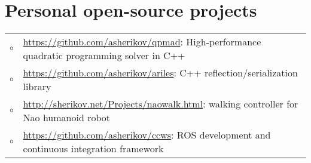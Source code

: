 \documentclass[a4paper,10pt]{report}
\begin{document}
\vspace{0.15cm}
\section{Personal open-source projects}
\begin{adjustwidth}{0.5cm}{0pt}
    \begin{tabularx}{\linewidth}{l X}
        \hfill $\circ$  & \url{https://github.com/asherikov/qpmad}:
                            High-performance quadratic programming solver in C++ \\

        \hfill $\circ$  & \url{https://github.com/asherikov/ariles}:
                            C++ reflection/serialization library \\

        \hfill $\circ$  & \url{http://sherikov.net/Projects/naowalk.html}:
                            walking controller for Nao humanoid robot \\

        \hfill $\circ$  & \url{https://github.com/asherikov/ccws}:
                            ROS development and continuous integration framework
    \end{tabularx}
\end{adjustwidth}


\vspace{0.15cm}
\end{document}
